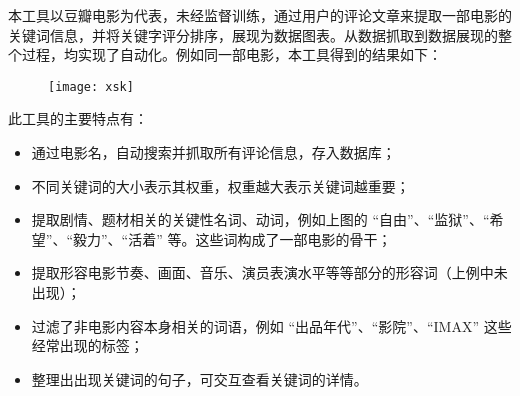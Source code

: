 \documentclass[10pt]{article}
\begin{document}
本工具以豆瓣电影为代表，未经监督训练，通过用户的评论文章来提取一部电影的关键词信息，并将关键字评分排序，展现为数据图表。从数据抓取到数据展现的整个过程，均实现了自动化。例如同一部电影，本工具得到的结果如下：%

\begin{figure}[h]%
\begin{mdcenter}%

\noindent{}\texttt{[image: xsk]}{}%

\mdhr{}%

\noindent{}%
\end{mdcenter}\label{fig-xsk}%
\end{figure}%

\noindent{}此工具的主要特点有：%

\begin{itemize}[noitemsep,topsep=\mdcompacttopsep]%

\item{}通过电影名，自动搜索并抓取所有评论信息，存入数据库；%

\item{}不同关键词的大小表示其权重，权重越大表示关键词越重要；%

\item{}提取剧情、题材相关的关键性名词、动词，例如上图的 “自由”、“监狱”、“希望”、“毅力”、“活着” 等。这些词构成了一部电影的骨干；%

\item{}提取形容电影节奏、画面、音乐、演员表演水平等等部分的形容词（上例中未出现）；%

\item{}过滤了非电影内容本身相关的词语，例如 \textquotedblleft{}出品年代\textquotedblright{}、\textquotedblleft{}影院\textquotedblright{}、\textquotedblleft{}IMAX\textquotedblright{} 这些经常出现的标签；%

\item{}整理出出现关键词的句子，可交互查看关键词的详情。%
\end{itemize}%
\end{document}
